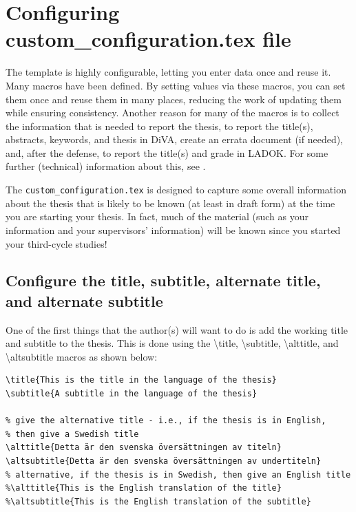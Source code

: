 \documentclass[12pt, twoside]{article}
\newcommand{\fname}[1]{\texttt{#1}}
\begin{document}
\section{Configuring custom\_configuration.tex file}
\label{sec:configuringCustomConfig}

The template is highly configurable, letting you enter data once and reuse it. Many macros have been defined. By setting values via these macros, you can set them once and reuse them in many places, reducing the work of updating them while ensuring consistency. Another reason for many of the macros is to collect the information that is needed to report the thesis, \ie to report the title(s), abstracts, keywords, and thesis in \gls{DiVA}, create an errata document (if needed), and, after the defense, to report the title(s) and grade in \gls{LADOK}.
For some further (technical) information about this, see .

The \fname{custom\_configuration.tex} is designed to capture some overall information about the thesis that is likely to be known (at least in draft form) at the time you are starting your thesis. In fact, much of the material (such as your information and your supervisors' information) will be known since you started your third-cycle studies!

\subsection{Configure the title, subtitle, alternate title, and alternate subtitle}
\label{sec:configuringTitleSubtitle}
One of the first things that the author(s) will want to do is add the working title and subtitle to the thesis. This is done using the \textbackslash title, \textbackslash subtitle, \textbackslash alttitle, and \textbackslash altsubtitle macros as shown below:
\begin{lstlisting}[style=latexExampleForAuthors]
\title{This is the title in the language of the thesis}
\subtitle{A subtitle in the language of the thesis}

% give the alternative title - i.e., if the thesis is in English,
% then give a Swedish title
\alttitle{Detta är den svenska översättningen av titeln}
\altsubtitle{Detta är den svenska översättningen av undertiteln}
% alternative, if the thesis is in Swedish, then give an English title
%\alttitle{This is the English translation of the title}
%\altsubtitle{This is the English translation of the subtitle}
\end{lstlisting}
\end{document}

